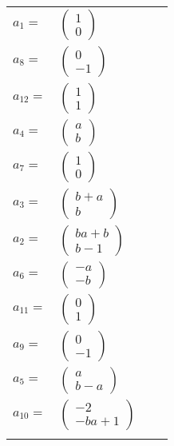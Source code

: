 \documentclass[1p]{elsarticle_modified}
\theoremstyle{definition}
\begin{document}
\begin{tabular}{m{7pt} m{180pt} m{7pt} m{180pt} }
\flushright $a_{1}=$&$\begin{pmatrix}1\\0\end{pmatrix}$ \\
\flushright $a_{8}=$&$\begin{pmatrix}0\\-1\end{pmatrix}$ \\
\flushright $a_{12}=$&$\begin{pmatrix}1\\1\end{pmatrix}$ \\
\flushright $a_{4}=$&$\begin{pmatrix}a\\b\end{pmatrix}$ \\
\flushright $a_{7}=$&$\begin{pmatrix}1\\0\end{pmatrix}$ \\
\flushright $a_{3}=$&$\begin{pmatrix}b+a\\b\end{pmatrix}$ \\
\flushright $a_{2}=$&$\begin{pmatrix}b a+b\\b-1\end{pmatrix}$ \\
\flushright $a_{6}=$&$\begin{pmatrix}- a\\- b\end{pmatrix}$ \\
\flushright $a_{11}=$&$\begin{pmatrix}0\\1\end{pmatrix}$ \\
\flushright $a_{9}=$&$\begin{pmatrix}0\\-1\end{pmatrix}$ \\
\flushright $a_{5}=$&$\begin{pmatrix}a\\b- a\end{pmatrix}$ \\
\flushright $a_{10}=$&$\begin{pmatrix}-2\\- b a+1\end{pmatrix}$\\&\end{tabular}
\end{document}
